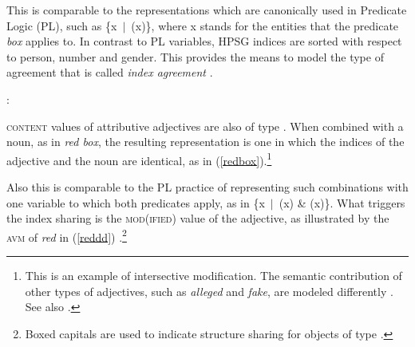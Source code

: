 \documentclass[output=paper
	        ,collection
	        ,collectionchapter
 	        ,biblatex
                ,babelshorthands
                ,newtxmath
                ,draftmode
                ,colorlinks, citecolor=brown
]{langscibook}
\begin{document}
\ea\label{red} 
\z

\noindent
This is comparable to the representations which are canonically used in 
Predicate Logic (PL), such as \{x~$|$~(x)\}, where x stands for 
the entities that the predicate \emph{box} applies to. In contrast to 
PL variables, HPSG indices are sorted with respect to person, number 
and gender. This provides the means to model the type of agreement that 
is called \emph{index agreement} .

\begin{exe} 
\ex  {}:  
\end{exe} 

\textsc{content} values of attributive adjectives are also of type . 
When combined with a noun, as in \emph{red box}, the resulting representation 
is one in which the indices of the adjective and the noun are identical, as in 
(\ref{redbox}).\footnote{This is an example of intersective modification. 
The semantic contribution of other types of adjectives, such as  
\emph{alleged} and \emph{fake}, are modeled differently \citep[330--331]{ps2}. See also
.}   

\begin{exe} 
\ex\label{redbox} 
\end{exe}

\noindent
Also this is comparable to the PL practice of representing such 
combinations with one variable to which both predicates apply, as in 
\{x~$|$~(x) \& (x)\}. What triggers the index sharing is 
the \textsc{mod(ified)} value of the adjective, as illustrated by the \textsc{avm} of 
\emph{red} in (\ref{reddd}) \citep[55]{ps2}.\footnote{Boxed  capitals
are used to indicate structure sharing for objects of 
type  \citep[]{GS00}.} 
\end{document}
